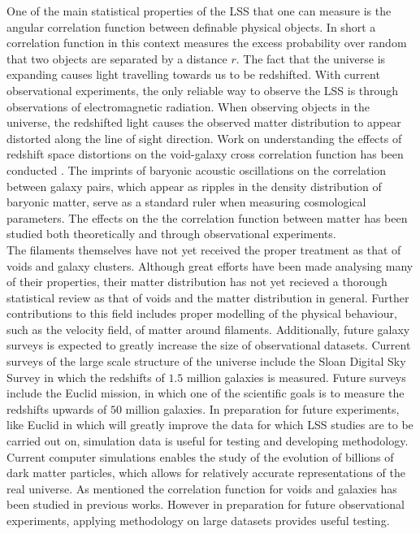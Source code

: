 One of the main statistical properties of the LSS that one can measure is the angular correlation function between definable physical objects. In short a correlation function in this context measures the excess probability over random that two objects are separated by a distance $r$. The fact that the universe is expanding\cite{Hubble168} causes light travelling towards us to be redshifted. With current observational experiments, the only reliable way to observe the LSS is through observations of electromagnetic radiation. When observing objects in the universe, the redshifted light causes the observed matter distribution to appear distorted along the line of sight direction. Work on understanding the effects of redshift space distortions on the void-galaxy cross correlation function has been conducted \cite{Nadathur_corr}. The imprints of baryonic acoustic oscillations on the correlation between galaxy pairs\cite{pe00300h}, which appear as ripples in the density distribution of baryonic matter, serve as a standard ruler when measuring cosmological parameters. The effects on the the correlation function between matter has been studied both theoretically\cite{peebles1980} and through observational experiments\cite{Eisenstein_2005}. \\\indent
The filaments themselves have not yet received the proper treatment as that of voids and galaxy clusters. Although great efforts have been made analysing many of their properties\cite{Libeskind_2017}, their matter distribution has not yet recieved a thorough statistical review as that of voids and the matter distribution in general. Further contributions to this field includes proper modelling of the physical behaviour, such as the velocity field, of matter around filaments. Additionally, future galaxy surveys is expected to greatly increase the size of observational datasets. Current surveys of the large scale structure of the universe include the Sloan Digital Sky Survey \cite{Eisenstein_2011} in which the redshifts of $1.5$ million galaxies is measured. Future surveys include the Euclid mission, in which one of the scientific goals is to measure the redshifts upwards of $50$ million galaxies\cite{eucliddefinition}. In preparation for future experiments, like Euclid in which will greatly improve the data for which LSS studies are to be carried out on, simulation data is useful for testing and developing methodology. Current computer simulations enables the study of the evolution of billions of dark matter particles\cite{Millennium}\cite{Multidark_dataset}, which allows for relatively accurate representations of the real universe. As mentioned the correlation function for voids and galaxies has been studied in previous works. However in preparation for future observational experiments, applying methodology on large datasets provides useful testing.\\\indent
